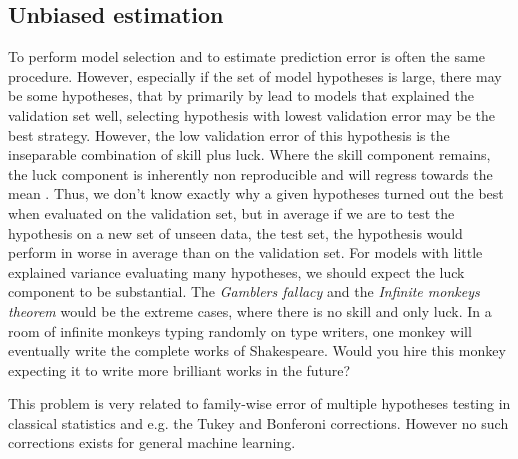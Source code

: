 \subsection{Unbiased estimation}
\label{unbiased_estimation}
To perform model selection and to estimate prediction error is often the same procedure. However, especially if the set of model hypotheses is large, there may be some hypotheses, that by primarily by lead to models that explained the validation set well, selecting hypothesis with lowest validation error may be the best strategy. However, the low validation error of this hypothesis is the inseparable combination of skill plus luck. Where the skill component remains, the luck component is inherently non reproducible and will regress towards the mean \cite{kahneman2011thinking}. Thus, we don't know exactly why a given hypotheses turned out the best when evaluated on the validation set, but in average if we are to test the hypothesis on a new set of unseen data, the test set, the hypothesis would perform in worse in average than on the validation set. For models with little explained variance evaluating many hypotheses, we should expect the luck component to be substantial. The \textit{Gamblers fallacy} and the \textit{Infinite monkeys theorem} would be the extreme cases, where there is no skill and only luck. In a room of infinite monkeys typing randomly on type writers, one monkey will eventually write the complete works of Shakespeare. Would you hire this monkey expecting it to write more brilliant works in the future? \cite{wiki:gamblers,monkeys}

This problem is very related to family-wise error of multiple hypotheses testing in classical statistics and e.g. the Tukey and Bonferoni corrections. However no such corrections exists for general machine learning.

